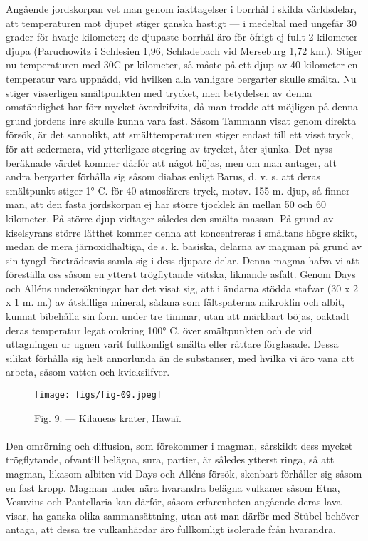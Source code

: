 \documentclass[a4paper, 12pt, oneside, swedish]{article}
\begin{document}
Angående jordskorpan vet man genom iakttagelser i borrhål i skilda världsdelar, att temperaturen mot djupet stiger ganska hastigt --- i medeltal med ungefär 30 grader för hvarje kilometer; de djupaste borrhål äro för öfrigt ej fullt 2 kilometer djupa (Paruchowitz i Schlesien 1,96, Schladebach vid Merseburg 1,72 km.). Stiger nu temperaturen med 30C pr kilometer, så måste på ett djup av 40 kilometer en temperatur vara uppnådd, vid hvilken alla vanligare bergarter skulle smälta. Nu stiger visserligen smältpunkten med trycket, men betydelsen av denna omständighet har förr mycket överdrifvits, då man trodde att möjligen på denna grund jordens inre skulle kunna vara fast. Såsom Tammann visat genom direkta försök, är det sannolikt, att smälttemperaturen stiger endast till ett visst tryck, för att sedermera, vid ytterligare stegring av trycket, åter sjunka. Det nyss beräknade värdet kommer därför att något höjas, men om man antager, att andra bergarter förhålla sig såsom diabas enligt Barus, d. v. s. att deras smältpunkt stiger 1° C. för 40 atmosfärers tryck, motsv. 155 m. djup, så finner man, att den fasta jordskorpan ej har större tjocklek än mellan 50 och 60 kilometer. På större djup vidtager således den smälta massan. På grund av kiselsyrans större lätthet kommer denna att koncentreras i smältans högre skikt, medan de mera järnoxidhaltiga, de s. k. basiska, delarna av magman på grund av sin tyngd företrädesvis samla sig i dess djupare delar. Denna magma hafva vi att föreställa oss såsom en ytterst trögflytande vätska, liknande asfalt. Genom Days och Alléns undersökningar har det visat sig, att i ändarna stödda stafvar (30 x 2 x 1 m. m.) av åtskilliga mineral, sådana som fältspaterna mikroklin och albit, kunnat bibehålla sin form under tre timmar, utan att märkbart böjas, oaktadt deras temperatur legat omkring 100° C. över smältpunkten och de vid uttagningen ur ugnen varit fullkomligt smälta eller rättare förglasade. Dessa silikat förhålla sig helt annorlunda än de substanser, med hvilka vi äro vana att arbeta, såsom vatten och kvicksilfver.

\begin{figure}[H]
\centering
\texttt{[image: figs/fig-09.jpeg]}
\caption{Fig. 9. --- Kilaueas krater, Hawaï.}
\end{figure}
\paragraph{}
Den omrörning och diffusion, som förekommer i magman, särskildt dess mycket trögflytande, ofvantill belägna, sura, partier, är således ytterst ringa, så att magman, likasom albiten vid Days och Alléns försök, skenbart förhåller sig såsom en fast kropp. Magman under nära hvarandra belägna vulkaner såsom Etna, Vesuvius och Pantellaria kan därför, såsom erfarenheten angående deras lava visar, ha ganska olika sammansättning, utan att man därför med Stübel behöver antaga, att dessa tre vulkanhärdar äro fullkomligt isolerade från hvarandra.
\end{document}
